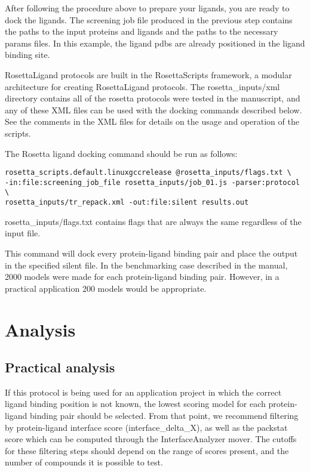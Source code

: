 After following the procedure above to prepare your ligands, you are ready to dock the ligands.
The screening job file produced in the previous step contains the paths to the input proteins and ligands and the paths to the necessary params files.
In this example, the ligand pdbs are already positioned in the ligand binding site.

RosettaLigand protocols are built in the RosettaScripts framework, a modular architecture for creating RosettaLigand protocols.
The rosetta\_inputs/xml directory contains all of the rosetta protocols were tested in the manuscript, and any of these \ac{XML} files can be used with the docking commands described below. 
See the comments in the \ac{XML} files for details on the usage and operation of the scripts. 

The Rosetta ligand docking command should be run as follows:

\begin{verbatim}
rosetta_scripts.default.linuxgccrelease @rosetta_inputs/flags.txt \
-in:file:screening_job_file rosetta_inputs/job_01.js -parser:protocol \
rosetta_inputs/tr_repack.xml -out:file:silent results.out
\end{verbatim}

rosetta\_inputs/flags.txt contains flags that are always the same regardless of the input file.

This command will dock every protein-ligand binding pair and place the output in the specified silent file.
In the benchmarking case described in the manual, 2000 models were made for each protein-ligand binding pair. 
However, in a practical application 200 models would be appropriate.

\section{Analysis}

\subsection{Practical analysis}

If this protocol is being used for an application project in which the correct ligand binding position is not known, the lowest scoring model for each protein-ligand binding pair should be selected.
From that point, we recommend filtering by protein-ligand interface score (interface\_delta\_X), as well as the packstat score\citep{Sheffler:2009bd} which can be computed through the InterfaceAnalyzer mover.
The cutoffs for these filtering steps should depend on the range of scores present, and the number of compounds it is possible to test.

